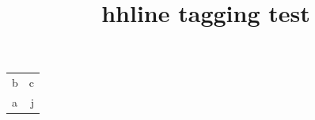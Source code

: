 \documentclass{article}
\title{hhline tagging test}
\begin{document}
\begin{tabular}{lr}
b & c\\
\hhline{==}
a & j
\end{tabular}
\end{document}
